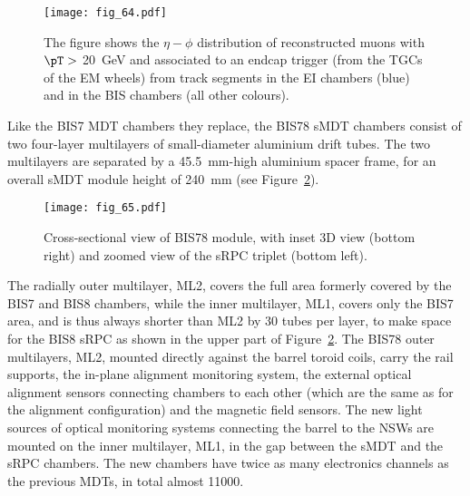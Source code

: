 \documentclass[cernpreprint, atlasdraft=false, UKenglish,british,orcidlogo, texmf, orcidlogo]{atlasdoc}
\begin{document}
 
 
\begin{figure}[!h]
\centering
\texttt{[image: fig\_64.pdf]}
\caption[Muon rates]{
The figure shows the $\eta-\phi$ distribution of reconstructed muons with $\pT >$ \SI{20}{\GeV} and associated to an endcap trigger (from the \glspl{TGC} of the EM wheels)
from track segments in the EI chambers (blue) and in the BIS chambers (all other colours). \label{fig:Muon_rate}}
\end{figure}
 
Like the BIS7 \gls{MDT} chambers they replace, the
\gls{BIS78} \gls{sMDT} chambers consist of two four-layer multilayers of small-diameter aluminium drift tubes.
The two multilayers are separated by a \SI{45.5}{\mm}-high aluminium spacer frame, for an overall \gls{sMDT} module height of \SI{240}{\mm} (see  Figure~\ref{fig:BIS78Xsec}).
\begin{figure}[!h]
\centering
\texttt{[image: fig\_65.pdf]}
\caption{Cross-sectional view of \gls{BIS78} module, with inset 3D view (bottom right) and zoomed view of the \gls{sRPC} triplet (bottom left).
\label{fig:BIS78Xsec}}
\end{figure}
The radially outer multilayer, ML2, covers the full area formerly covered by the BIS7 and BIS8 chambers, while the inner multilayer, ML1, covers only the BIS7 area, and is thus always shorter than ML2 by \num{30} tubes per layer, to make space for the BIS8 \gls{sRPC} as shown in the upper part of Figure~\ref{fig:BIS78Xsec}.
The \gls{BIS78} outer multilayers, ML2, mounted directly against the barrel toroid coils, carry the rail supports,
the in-plane alignment monitoring system, the external 
optical alignment sensors connecting chambers to each other (which are the same as for the \RunOneTwo alignment configuration) and the magnetic field sensors.
The new light sources of optical monitoring systems connecting the barrel to the \glspl{NSW} are mounted on the inner multilayer, ML1, in the gap between the \gls{sMDT} and the \gls{sRPC} chambers.
The new chambers have twice as many electronics channels as the previous \glspl{MDT}, in total almost \num{11000}.
 
\end{document}
